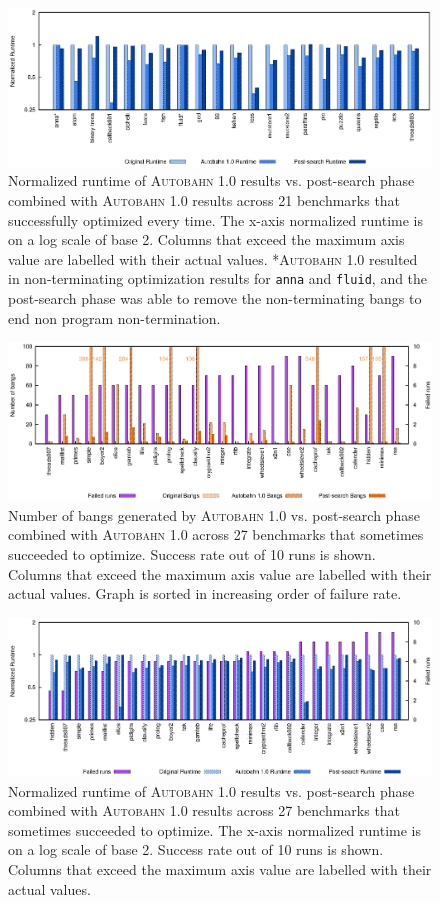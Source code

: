 \documentclass[format=sigplan, review=true]{acmart}
\newcommand{\Ao}[0]{\textsc{Autobahn 1.0}}
\newcommand{\postopt}[0]{post-search}
\begin{document}
\begin{figure}
\includegraphics[width=\textwidth]{aut-post}
\caption{Normalized runtime of \Ao{} results vs. \postopt{} phase combined with \Ao{} results across 21 benchmarks that successfully optimized every time. The x-axis normalized runtime is on a log scale of base 2. Columns that exceed the maximum axis value are labelled with their actual values. *\Ao{} resulted in non-terminating optimization results for \texttt{anna} and \texttt{fluid}, and the \postopt{} phase was able to remove the non-terminating bangs to end non program non-termination. }
\end{figure}

\begin{figure}
\includegraphics[width=\textwidth]{ap-partial-bangs}
\caption{Number of bangs generated by \Ao{} vs. \postopt{} phase combined with \Ao{} across 27 benchmarks that sometimes succeeded to optimize. Success rate out of 10 runs is shown. Columns that exceed the maximum axis value are labelled with their actual values. Graph is sorted in increasing order of failure rate.}
\end{figure}

\begin{figure}
\includegraphics[width=\textwidth]{ap-partial}
\caption{Normalized runtime of \Ao{} results vs. \postopt{} phase combined with \Ao{} results across 27 benchmarks that sometimes succeeded to optimize. The x-axis normalized runtime is on a log scale of base 2. Success rate out of 10 runs is shown. Columns that exceed the maximum axis value are labelled with their actual values.}
\end{figure}
\end{document}
